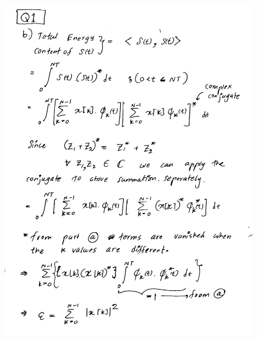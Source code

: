 \documentclass[a4paper,11pt]{article}%
\begin{document}
\begin{figure}[!h]
	\includegraphics[scale=0.22]{figures/img2}
\end{figure}
\end{document}
